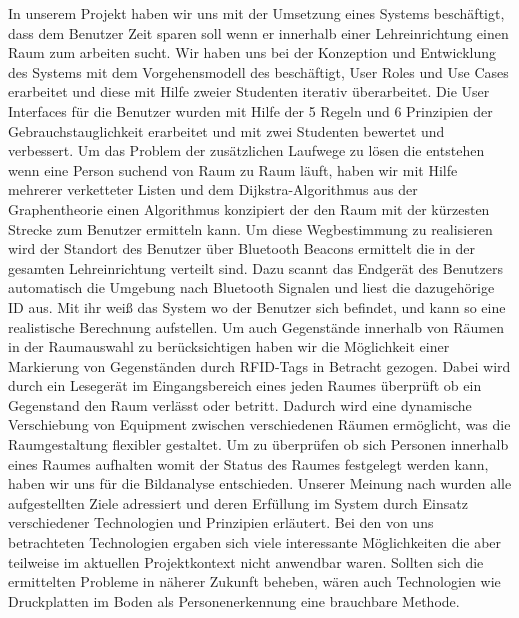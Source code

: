 In unserem Projekt haben wir uns mit der Umsetzung eines Systems beschäftigt,
dass dem Benutzer Zeit sparen soll wenn er innerhalb einer Lehreinrichtung
einen Raum zum arbeiten sucht. Wir haben uns bei der Konzeption und Entwicklung
des Systems mit dem Vorgehensmodell des \citep{[Usage-Centred Design](Buch)}
beschäftigt, User Roles und Use Cases erarbeitet und diese mit Hilfe zweier
Studenten iterativ überarbeitet. Die User Interfaces für die Benutzer wurden
mit Hilfe der 5 Regeln und 6 Prinzipien der Gebrauchstauglichkeit erarbeitet
und mit zwei Studenten bewertet und verbessert. Um das Problem der zusätzlichen
Laufwege zu lösen die entstehen wenn eine Person suchend von Raum zu Raum
läuft, haben wir mit Hilfe mehrerer verketteter Listen und dem
Dijkstra-Algorithmus aus der Graphentheorie einen Algorithmus konzipiert der den
Raum mit der kürzesten Strecke zum Benutzer ermitteln kann. Um diese
Wegbestimmung zu realisieren wird der Standort des Benutzer über Bluetooth
Beacons ermittelt die in der gesamten Lehreinrichtung verteilt sind.
Dazu scannt das Endgerät des Benutzers automatisch die Umgebung nach Bluetooth
Signalen und liest die dazugehörige ID aus. Mit ihr weiß das System wo der
Benutzer sich befindet, und kann so eine realistische Berechnung aufstellen.
Um auch Gegenstände innerhalb von Räumen in der Raumauswahl zu berücksichtigen
haben wir die Möglichkeit einer Markierung von Gegenständen durch RFID-Tags in
Betracht gezogen. Dabei wird durch ein Lesegerät im Eingangsbereich eines jeden
Raumes überprüft ob ein Gegenstand den Raum verlässt oder betritt. Dadurch wird
eine dynamische Verschiebung von Equipment zwischen verschiedenen Räumen
ermöglicht, was die Raumgestaltung flexibler gestaltet. Um zu überprüfen ob
sich Personen innerhalb eines Raumes aufhalten womit der Status des Raumes
festgelegt werden kann, haben wir uns für die Bildanalyse entschieden.
Unserer Meinung nach wurden alle aufgestellten Ziele adressiert und deren
Erfüllung im System durch Einsatz verschiedener Technologien und Prinzipien
erläutert.
Bei den von uns betrachteten Technologien ergaben sich viele interessante
Möglichkeiten die aber teilweise im aktuellen Projektkontext nicht anwendbar
waren. Sollten sich die ermittelten Probleme in näherer Zukunft beheben, wären
auch Technologien wie Druckplatten im Boden als Personenerkennung eine
brauchbare Methode.
\citet{ISO9126}
